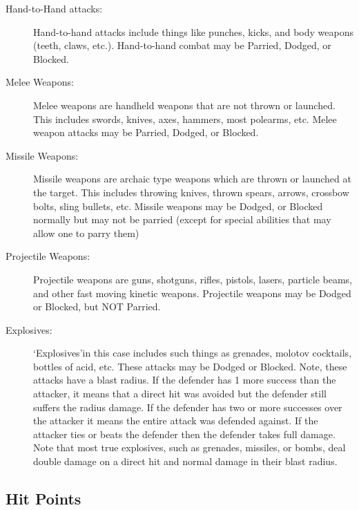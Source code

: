 \documentclass[twoside]{book}
\begin{document}
\begin{description}
    
  \item[Hand-to-Hand attacks:] 
    {  
    Hand-to-hand attacks include things like punches, kicks, and body weapons (teeth, claws, etc.). Hand-to-hand combat may be Parried, Dodged, or Blocked.
    }
  
  \item[Melee Weapons:] 
    {  
    Melee weapons are handheld weapons that are not thrown or launched. This includes swords, knives, axes, hammers, most polearms, etc. Melee weapon attacks may be Parried, Dodged, or Blocked.
    }
  
  \item[Missile Weapons:] 
    {  
    Missile weapons are archaic type weapons which are thrown or launched at the target. This includes throwing knives, thrown spears, arrows, crossbow bolts, sling bullets, etc. Missile weapons may be Dodged, or Blocked normally but may not be parried (except for special abilities that may allow one to parry them)
    }
  
  \item[Projectile Weapons:] 
    {  
    Projectile weapons are guns, shotguns, rifles, pistols, lasers, particle beams, and other fast moving kinetic weapons. Projectile weapons may be Dodged or Blocked, but NOT Parried.
    }
  
  \item[Explosives:] 
    {  
    `Explosives'in this case includes such things as grenades, molotov cocktails, bottles of acid, etc. These attacks may be Dodged or Blocked. Note, these attacks have a blast radius. If the defender has 1 more success than the attacker, it means that a direct hit was avoided but the defender still suffers the radius damage. If the defender has two or more successes over the attacker it means the entire attack was defended against. If the attacker ties or beats the defender then the defender takes full damage. Note that most true explosives, such as grenades, missiles, or bombs, deal double damage on a direct hit and normal damage in their blast radius.
    }
  
\end{description}
  
    

\subsection{Hit Points}
    
\end{document}
